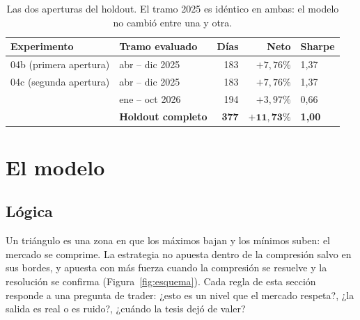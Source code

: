 \documentclass[10pt,a4paper]{article}
\begin{document}
\begin{table}[htbp]\centering\small
\begin{tabular}{@{}llrrl@{}}
\toprule
Experimento & Tramo evaluado & Días & Neto & Sharpe \\
\midrule
04b (primera apertura) & abr -- dic 2025        & 183 & $+7{,}76\%$  & 1,37 \\
\addlinespace
04c (segunda apertura) & abr -- dic 2025        & 183 & $+7{,}76\%$  & 1,37 \\
                       & ene -- oct 2026        & 194 & $+3{,}97\%$  & 0,66 \\
                       & \textbf{Holdout completo} & \textbf{377} & $\mathbf{+11{,}73\%}$ & \textbf{1,00} \\
\bottomrule
\end{tabular}
\caption{Las dos aperturas del holdout. El tramo 2025 es idéntico en ambas: el
modelo no cambió entre una y otra.}\label{tab:apertura}
\end{table}

\section{El modelo}\label{sec:modelo}

\subsection{Lógica}

Un triángulo es una zona en que los máximos bajan y los mínimos suben: el mercado
se comprime. La estrategia no apuesta dentro de la compresión salvo en sus bordes,
y apuesta con más fuerza cuando la compresión se resuelve y la resolución se
confirma (Figura~\ref{fig:esquema}). Cada regla de esta sección responde a una
pregunta de trader: ¿esto es un nivel que el mercado respeta?, ¿la salida es real
o es ruido?, ¿cuándo la tesis dejó de valer?
\end{document}
